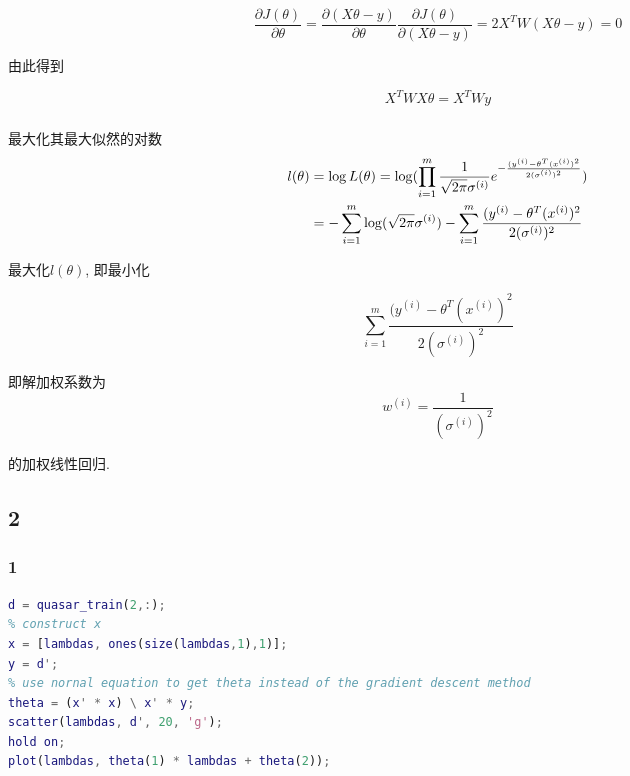 \documentclass{ctexart}
\begin{document}
\subsubsection{}

\begin{equation}
	\frac{\partial J(\theta)}{\partial \theta} = \frac{\partial (X\theta - y)}{\partial \theta} \frac{\partial J(\theta)}{\partial (X\theta - y)} = 2X^TW(X\theta - y) = 0
\end{equation}

由此得到

\begin{equation}
	X^TWX\theta = X^TWy
\end{equation}

\subsubsection{}
最大化其最大似然的对数
\begin{align}
	l(\theta) &= \log L(\theta) = \log(\prod_{i=1}^m \frac{1}{\sqrt{2\pi}\sigma^{(i)}}e^{-\frac{(y^{(i)}-\theta^T(x^{(i)})^2}{2(\sigma^{(i)})^2}})  \notag \\
	&= -\sum_{i=1}^m\log(\sqrt{2\pi}\sigma^{(i)}) - \sum_{i=1}^m \frac{(y^{(i)}-\theta^T(x^{(i)})^2}{2(\sigma^{(i)})^2} \notag \\
\end{align}

最大化$l(\theta)$, 即最小化

$$
	\sum_{i=1}^m \frac{(y^{(i)}-\theta^T(x^{(i)})^2}{2(\sigma^{(i)})^2}
$$

即解加权系数为
$$
	w^{(i)} = \frac{1}{(\sigma^{(i)})^2}
$$

的加权线性回归.

\subsection{2}

\subsubsection{1}
\begin{lstlisting}[language = MATLAB]
d = quasar_train(2,:);
% construct x 
x = [lambdas, ones(size(lambdas,1),1)];
y = d';
% use nornal equation to get theta instead of the gradient descent method
theta = (x' * x) \ x' * y;
scatter(lambdas, d', 20, 'g');
hold on;
plot(lambdas, theta(1) * lambdas + theta(2));	
\end{lstlisting}
\end{document}
